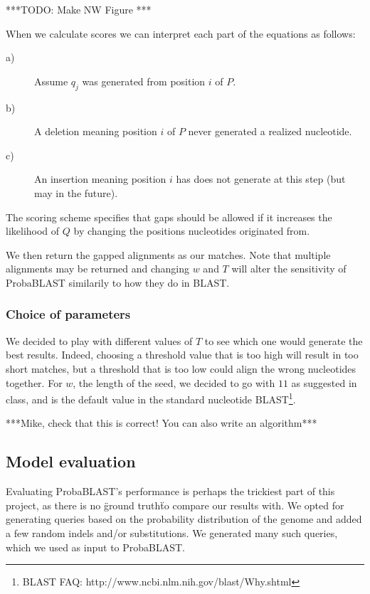 \documentclass[12pt]{article}%
\begin{document}
***TODO: Make NW Figure ***

When we calculate scores we can interpret each part of the equations as follows:

\begin{description}
  \item[a)] Assume $q_j$ was generated from position $i$ of $P$.
  \item[b)] A deletion meaning position $i$ of $P$ never generated a realized nucleotide.
  \item[c)] An insertion meaning position $i$ has does not generate at this step (but may in the future).
\end{description}

The scoring scheme specifies that gaps should be allowed if it increases the likelihood of $Q$ by changing the positions nucleotides originated from.

We then return the gapped alignments as our matches. Note that multiple alignments may be returned and changing $w$ and $T$ will alter the sensitivity of ProbaBLAST similarily to how they do in BLAST.

\subsubsection{Choice of parameters}

We decided to play with different values of $T$ to see which one would generate the best results. Indeed, choosing a threshold value that is too high will result in too short matches, but a threshold that is too low could align the wrong nucleotides together.
For $w$, the length of the seed, we decided to go with $11$ as suggested in class, and is the default value in the standard nucleotide BLAST\footnote{BLAST FAQ: http://www.ncbi.nlm.nih.gov/blast/Why.shtml}.

***Mike, check that this is correct! You can also write an algorithm***

\subsection{Model evaluation}

Evaluating ProbaBLAST's performance is perhaps the trickiest part of this project, as there is no \"ground truth\" to compare our results with. We opted for generating queries based on the probability distribution of the genome and added a few random indels and/or substitutions. We generated many such queries, which we used as input to ProbaBLAST.
\end{document}

